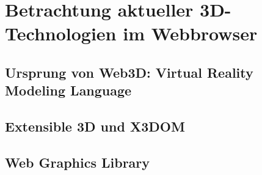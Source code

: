 \chapter{Betrachtung aktueller 3D-Technologien im Webbrowser}
\label{CHAP:TECHNOLOGIES}

\section{Ursprung von Web3D: Virtual Reality Modeling Language}


\section{Extensible 3D und X3DOM}


\section{Web Graphics Library}

